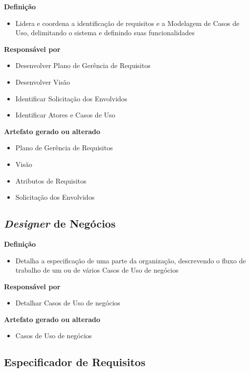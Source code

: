 \textbf{Definição}
\begin{itemize}
\item Lidera e coordena a identificação de requisitos e a Modelagem de Casos de Uso, delimitando o sistema e definindo suas funcionalidades
\end{itemize}

\textbf{Responsável por}
\begin{itemize}
\item Desenvolver Plano de Gerência de Requisitos
\item Desenvolver Visão
\item Identificar Solicitação dos Envolvidos
\item Identificar Atores e Casos de Uso
\end{itemize}

\textbf{Artefato gerado ou alterado}
\begin{itemize}
\item Plano de Gerência de Requisitos
\item Visão
\item Atributos de Requisitos
\item Solicitação dos Envolvidos
\end{itemize}

\subsection{\textit{Designer} de Negócios}

\textbf{Definição}
\begin{itemize}
\item Detalha a especificação de uma parte da organização, descrevendo o fluxo de trabalho de um ou de vários Casos de Uso de negócios
\end{itemize}

\textbf{Responsável por}
\begin{itemize}
\item Detalhar Casos de Uso de negócios
\end{itemize}

\textbf{Artefato gerado ou alterado}
\begin{itemize}
\item Casos de Uso de negócios
\end{itemize}

\subsection{Especificador de Requisitos}


